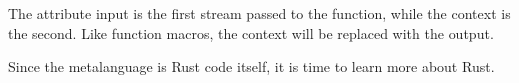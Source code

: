 The \colorbox{input}{attribute input} is the first stream passed to the function, while the \colorbox{context}{context} is the second.
Like function macros, the \colorbox{context}{context} will be replaced with the \colorbox{output}{output}.

Since the metalanguage is Rust code itself, it is time to learn more about Rust.


